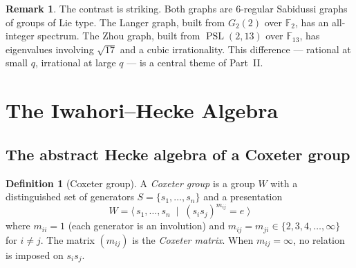 \documentclass[11pt,a4paper]{article}
\theoremstyle{plain}
\theoremstyle{definition}
\newtheorem{definition}[theorem]{Definition}
\newtheorem{remark}[theorem]{Remark}
\newcommand{\F}{\mathbb{F}}
\newcommand{\PSL}{\operatorname{PSL}}
\begin{document}
\begin{remark}
The contrast is striking. Both graphs are $6$-regular Sabidussi graphs
of groups of Lie type. The Langer graph, built from $G_2(2)$ over
$\F_2$, has an all-integer spectrum. The Zhou graph, built from
$\PSL(2,13)$ over $\F_{13}$, has eigenvalues involving $\sqrt{17}$
and a cubic irrationality. This difference --- rational at small $q$,
irrational at large $q$ --- is a central theme of Part~II.
\end{remark}


\section{The Iwahori--Hecke Algebra}
\label{sec:hecke}

\subsection{The abstract Hecke algebra of a Coxeter group}

\begin{tcolorbox}[breakable, colback=green!8, colframe=green!8,
  boxrule=0pt, sharp corners]
\begin{definition}[Coxeter group]
\label{def:coxeter}
A \emph{Coxeter group} is a group $W$ with a distinguished set of
generators $S = \{s_1, \ldots, s_n\}$ and a presentation
\[
  W = \langle\, s_1, \ldots, s_n \;\mid\;
  (s_i s_j)^{m_{ij}} = e \;\rangle
\]
where $m_{ii} = 1$ (each generator is an involution) and
$m_{ij} = m_{ji} \in \{2, 3, 4, \ldots, \infty\}$ for $i \neq j$.
The matrix $(m_{ij})$ is the \emph{Coxeter matrix}. When
$m_{ij} = \infty$, no relation is imposed on $s_i s_j$.
\end{definition}
\end{tcolorbox}
\end{document}
